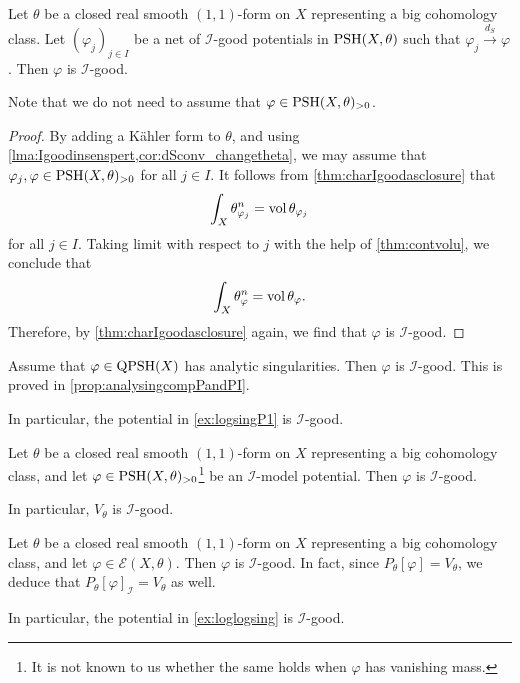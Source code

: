\begin{corollary}\label{cor:Igoodclosed}
    Let $\theta$ be a closed real smooth $(1,1)$-form on $X$ representing a big cohomology class.
    Let $(\varphi_j)_{j\in I}$ be a net of $\mathcal{I}$-good potentials in $\mathrm{PSH}(X,\theta)$ such that $\varphi_j\xrightarrow{d_S}\varphi$. Then $\varphi$ is $\mathcal{I}$-good.
\end{corollary}
Note that we do not need to assume that $\varphi\in \mathrm{PSH}(X,\theta)_{>0}$.
\begin{proof}
    By adding a Kähler form to $\theta$, and using \cref{lma:Igoodinsenspert,cor:dSconv_changetheta}, we may assume that $\varphi_j,\varphi\in \mathrm{PSH}(X,\theta)_{>0}$ for all $j\in I$. It follows from \cref{thm:charIgoodasclosure} that
    \[
        \int_X \theta_{\varphi_j}^n=\operatorname{vol} \theta_{\varphi_j}
    \]
    for all $j\in I$. Taking limit with respect to $j$ with the help of \cref{thm:contvolu}, we conclude that
    \[
        \int_X \theta_{\varphi}^n=\operatorname{vol} \theta_{\varphi}.
    \]
    Therefore, by \cref{thm:charIgoodasclosure} again, we find that $\varphi$ is $\mathcal{I}$-good.
\end{proof}

\begin{example}\label{ex:analyIgood}
    Assume that $\varphi\in \mathrm{QPSH}(X)$ has analytic singularities. Then $\varphi$ is $\mathcal{I}$-good. This is proved in \cref{prop:analysingcompPandPI}.

    In particular, the potential in \cref{ex:logsingP1} is $\mathcal{I}$-good.
\end{example}

\begin{example}\label{ex:ImodelIgood}
Let $\theta$ be a closed real smooth $(1,1)$-form on $X$ representing a big cohomology class, and let $\varphi\in \mathrm{PSH}(X,\theta)_{>0}$\footnote{It is not known to us whether the same holds when $\varphi$ has vanishing mass.} be an $\mathcal{I}$-model potential. Then $\varphi$ is $\mathcal{I}$-good.

In particular, $V_{\theta}$ is $\mathcal{I}$-good.
\end{example}

\begin{example}\label{ex:fullmassIgood}
Let $\theta$ be a closed real smooth $(1,1)$-form on $X$ representing a big cohomology class, and let $\varphi\in \mathcal{E}(X,\theta)$. Then $\varphi$ is $\mathcal{I}$-good. In fact, since $P_{\theta}[\varphi]=V_{\theta}$, we deduce that $P_{\theta}[\varphi]_{\mathcal{I}}=V_{\theta}$ as well.

    In particular, the potential in \cref{ex:loglogsing} is $\mathcal{I}$-good.
\end{example}

